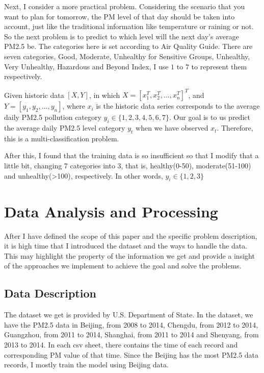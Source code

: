 \documentclass{sig-alternate}
\begin{document}
Next, I consider a more practical problem. Considering the scenario that you want to plan for tomorrow, the PM level of that day should be taken into account, just like the traditional information like temperature or raining or not. So the next problem is to predict to which level will the next day's average PM2.5 be. The categories here is set according to Air Quality Guide.\cite{level} There are seven categories, Good, Moderate, Unhealthy for Sensitive Groups, Unhealthy, Very Unhealthy, Hazardous and Beyond Index, I use $1$ to $7$ to represent them respectively.

\newtheorem{theorem1}{Promblem}
\begin{theorem}
Given historic data $[X,Y]$, in which $X=[x_{1}^{T},x_{2}^{T},...,x_{n}^{T}]^{T}$, and $Y=[y_1, y_2, ..., y_n]$, where $x_i$ is the historic data series corresponds to the average daily PM2.5 pollution category $y_i \in \{1, 2, 3, 4, 5, 6, 7\}$. Our goal is to us predict the average daily PM2.5 level category $y_t$ when we have observed $x_t$. Therefore, this is a multi-classification problem.
\end{theorem}

After this, I found that the training data is so insufficient so that I modify that a little bit, changing 7 categories into 3, that is, healthy(0-50), moderate(51-100) and unhealthy(>100), respectively. In other words, $y_i \in \{1, 2, 3\}$




\section{Data Analysis and Processing}
After I have defined the scope of this paper and the specific problem description, it is high time that I introduced the dataset and the ways to handle the data. This may highlight the property of the information we get and provide a insight of the approaches we implement to achieve the goal and solve the problems.

\subsection{Data Description}
The dataset we get is provided by U.S. Department of State\cite{data}. In the dataset, we have the PM2.5 data in Beijing, from 2008 to 2014, Chengdu, from 2012 to 2014, Guangzhou, from 2011 to 2014, Shanghai, from 2011 to 2014 and Shenyang, from 2013 to 2014. In each csv sheet, there contains the time of each record and corresponding PM value of that time. Since the Beijing has the most PM2.5 data records, I mostly train the model using Beijing data.
\end{document}
